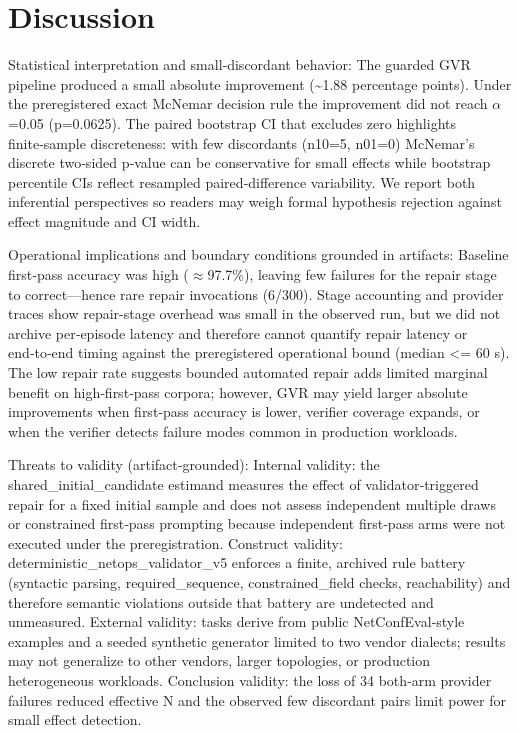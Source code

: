 \documentclass[conference]{IEEEtran}
\begin{document}
\section{Discussion}
Statistical interpretation and small‑discordant behavior: The guarded GVR pipeline produced a small absolute improvement (\textasciitilde{}1.88 percentage points). Under the preregistered exact McNemar decision rule the improvement did not reach \ensuremath{\alpha}=0.05 (p=0.0625). The paired bootstrap CI that excludes zero highlights finite‑sample discreteness: with few discordants (n10=5, n01=0) McNemar's discrete two‑sided p‑value can be conservative for small effects while bootstrap percentile CIs reflect resampled paired‑difference variability. We report both inferential perspectives so readers may weigh formal hypothesis rejection against effect magnitude and CI width.

Operational implications and boundary conditions grounded in artifacts: Baseline first‑pass accuracy was high (\ensuremath{\approx}97.7\%), leaving few failures for the repair stage to correct---hence rare repair invocations (6/300). Stage accounting and provider traces show repair-stage overhead was small in the observed run, but we did not archive per‑episode latency and therefore cannot quantify repair latency or end‑to‑end timing against the preregistered operational bound (median <= 60 s). The low repair rate suggests bounded automated repair adds limited marginal benefit on high‑first‑pass corpora; however, GVR may yield larger absolute improvements when first‑pass accuracy is lower, verifier coverage expands, or when the verifier detects failure modes common in production workloads.

Threats to validity (artifact‑grounded): Internal validity: the shared\_initial\_candidate estimand measures the effect of validator‑triggered repair for a fixed initial sample and does not assess independent multiple draws or constrained first‑pass prompting because independent first‑pass arms were not executed under the preregistration. Construct validity: deterministic\_netops\_validator\_v5 enforces a finite, archived rule battery (syntactic parsing, required\_sequence, constrained\_field checks, reachability) and therefore semantic violations outside that battery are undetected and unmeasured. External validity: tasks derive from public NetConfEval‑style examples and a seeded synthetic generator limited to two vendor dialects; results may not generalize to other vendors, larger topologies, or production heterogeneous workloads. Conclusion validity: the loss of 34 both‑arm provider failures reduced effective N and the observed few discordant pairs limit power for small effect detection.
\end{document}
